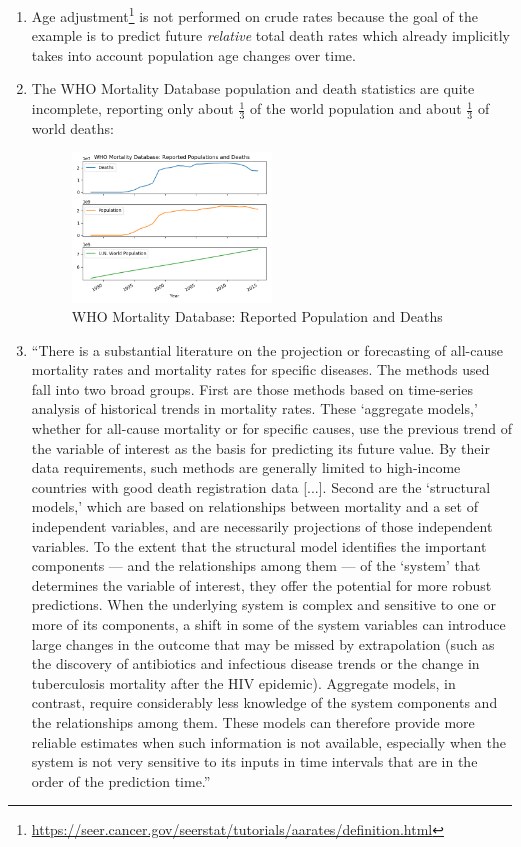 \documentclass[10pt, a4paper, twocolumn]{IEEEconf}
\begin{document}
\begin{enumerate}
\begin{enumerate}
    \end{enumerate}
  \item Age adjustment\footnote{\scriptsize{\url{https://seer.cancer.gov/seerstat/tutorials/aarates/definition.html}}} is not performed on crude rates because the goal of the example is to predict future \textit{relative} total death rates which already implicitly takes into account population age changes over time.
  \item The WHO Mortality Database population and death statistics are quite incomplete, reporting only about $\frac{1}{3}$ of the world population and about $\frac{1}{3}$ of world deaths:
    \begin{figure}[H]
      \centering
      \includegraphics[width=0.5\textwidth]{results/who_mortality_db_population_deaths.png}
      \caption{WHO Mortality Database: Reported Population and Deaths}
    \end{figure}
  \item \label{mathersquote} \enquote{There is a substantial literature on the projection or forecasting of all-cause mortality rates and mortality rates for specific diseases. The methods used fall into two broad groups. First are those methods based on time-series analysis of historical trends in mortality rates. These \enquote{aggregate models,} whether for all-cause mortality or for specific causes, use the previous trend of the variable of interest as the basis for predicting its future value. By their data requirements, such methods are generally limited to high-income countries with good death registration data [...]. Second are the \enquote{structural models,} which are based on relationships between mortality and a set of independent variables, and are necessarily projections of those independent variables. To the extent that the structural model identifies the important components — and the relationships among them — of the \enquote{system} that determines the variable of interest, they offer the potential for more robust predictions. When the underlying system is complex and sensitive to one or more of its components, a shift in some of the system variables can introduce large changes in the outcome that may be missed by extrapolation (such as the discovery of antibiotics and infectious disease trends or the change in tuberculosis mortality after the HIV epidemic). Aggregate models, in contrast, require considerably less knowledge of the system components and the relationships among them. These models can therefore provide more reliable estimates when such information is not available, especially when the system is not very sensitive to its inputs in time intervals that are in the order of the prediction time.} \citep{mathers2006projections}

\end{enumerate}
\end{document}
